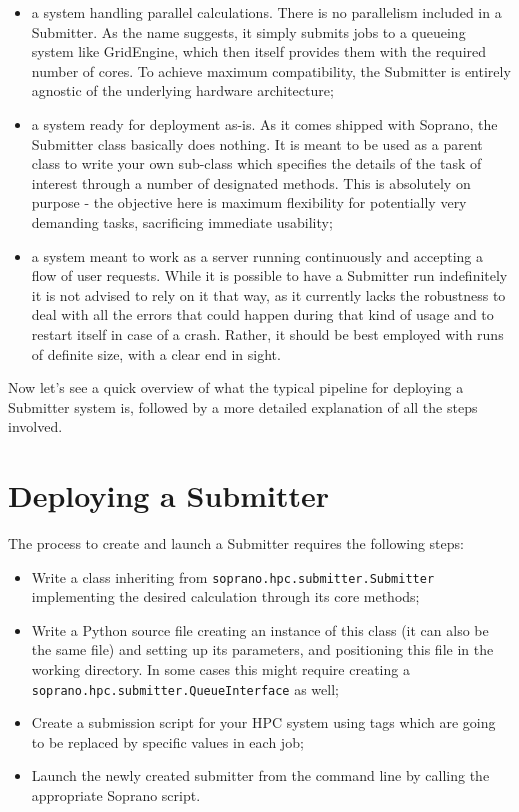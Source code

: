 \documentclass[]{report}
\begin{document}
\begin{itemize}
	\item a system handling parallel calculations. There is no parallelism included in a Submitter. As the name suggests, it simply submits jobs to a queueing system like GridEngine, which then itself provides them with the required number of cores. To achieve maximum compatibility, the Submitter is entirely agnostic of the underlying hardware architecture;
	\item a system ready for deployment as-is. As it comes shipped with Soprano, the Submitter class basically does nothing. It is meant to be used as a parent class to write your own sub-class which specifies the details of the task of interest through a number of designated methods. This is absolutely on purpose - the objective here is maximum flexibility for potentially very demanding tasks, sacrificing immediate usability;
	\item a system meant to work as a server running continuously and accepting a flow of user requests. While it is possible to have a Submitter run indefinitely it is not advised to rely on it that way, as it currently lacks the robustness to deal with all the errors that could happen during that kind of usage and to restart itself in case of a crash. Rather, it should be best employed with runs of definite size, with a clear end in sight.
\end{itemize}

Now let's see a quick overview of what the typical pipeline for deploying a Submitter system is, followed by a more detailed explanation of all the steps involved.

\chapter{Deploying a Submitter}

The process to create and launch a Submitter requires the following steps:

\begin{itemize}
	\item Write a class inheriting from \lstinline|soprano.hpc.submitter.Submitter| implementing the desired calculation through its core methods;
	\item Write a Python source file creating an instance of this class (it can also be the same file) and setting up its parameters, and positioning this file in the working directory. In some cases this might require creating a \lstinline|soprano.hpc.submitter.QueueInterface| as well;
	\item Create a submission script for your HPC system using tags which are going to be replaced by specific values in each job;
	\item Launch the newly created submitter from the command line by calling the appropriate Soprano script.
\end{itemize}
\end{document}
